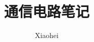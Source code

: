 \documentclass[11pt, oneside]{book}
\begin{document}
\title{通信电路笔记}
\author{Xiaohei}

\maketitle
\tableofcontents
\mainmatter

\setcounter{chapter}{-1}







\end{document}
